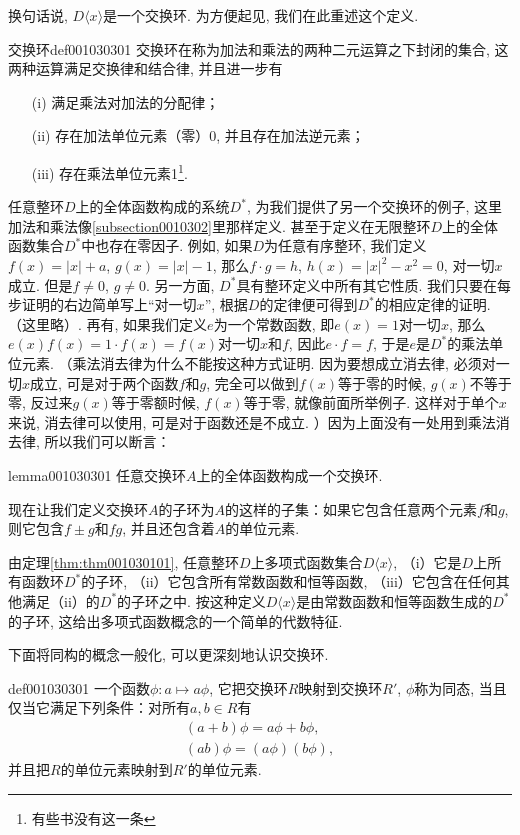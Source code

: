 换句话说, $D\langle{}x\rangle$是一个交换环. 为方便起见, 我们在此重述这个定义. 
\begin{definition}{交换环}{def001030301}
交换环在称为加法和乘法的两种二元运算之下封闭的集合, 这两种运算满足交换律和结合律, 并且进一步有
\begin{enumerate}
\item[(i)] 满足乘法对加法的分配律；
\item[(ii)] 存在加法单位元素（零）0, 并且存在加法逆元素；
\item[(iii)] 存在乘法单位元素1\footnote{有些书没有这一条}. 
\end{enumerate}
\end{definition}

任意整环$D$上的全体函数构成的系统$D^*$, 为我们提供了另一个交换环的例子, 这里加法和乘法像\ref{subsection0010302}里那样定义. 甚至于定义在无限整环$D$上的全体函数集合$D^*$中也存在零因子. 例如, 如果$D$为任意有序整环, 我们定义$f(x)=|x|+a$, $g(x)=|x|-1$, 那么$f\cdot{}g=h$, $h(x)=|x|^2-x^2=0$, 对一切$x$成立. 但是$f \neq 0$, $g \neq 0$. 另一方面, $D^*$具有整环定义中所有其它性质. 我们只要在每步证明的右边简单写上“对一切$x$”, 根据$D$的定律便可得到$D^*$的相应定律的证明. （这里略）. 再有, 如果我们定义$e$为一个常数函数, 即$e(x)=1$对一切$x$, 那么$e(x)f(x)=1\cdot{}f(x)=f(x)$对一切$x$和$f$, 因此$e \cdot f = f$, 于是$e$是$D^*$的乘法单位元素. （乘法消去律为什么不能按这种方式证明. 因为要想成立消去律, 必须对一切$x$成立, 可是对于两个函数$f$和$g$, 完全可以做到$f(x)$等于零的时候, $g(x)$不等于零, 反过来$g(x)$等于零额时候, $f(x)$等于零, 就像前面所举例子. 这样对于单个$x$来说, 消去律可以使用, 可是对于函数还是不成立. ）因为上面没有一处用到乘法消去律, 所以我们可以断言：
\begin{lemma}{}{lemma001030301}
任意交换环$A$上的全体函数构成一个交换环. 
\end{lemma}

现在让我们定义交换环$A$的子环为$A$的这样的子集：如果它包含任意两个元素$f$和$g$, 则它包含$f \pm g$和$fg$, 并且还包含着$A$的单位元素. 

由定理\ref{thm:thm001030101}, 任意整环$D$上多项式函数集合$D\langle{}x\rangle$, （i）它是$D$上所有函数环$D^*$的子环, （ii）它包含所有常数函数和恒等函数, （iii）它包含在任何其他满足（ii）的$D^*$的子环之中. 按这种定义$D\langle{}x\rangle$是由常数函数和恒等函数生成的$D^*$的子环, 这给出多项式函数概念的一个简单的代数特征. 

下面将同构的概念一般化, 可以更深刻地认识交换环. 
\begin{definition}{}{def001030301}
一个函数$\phi: a \mapsto a\phi$, 它把交换环$R$映射到交换环$R'$, $\phi$称为同态, 当且仅当它满足下列条件：对所有$a, b \in R$有
\begin{gather}
(a+b)\phi = a\phi + b\phi, \label{equ001030301}\\
(ab)\phi = (a\phi)(b\phi),\label{equ001030302}
\end{gather}
并且把$R$的单位元素映射到$R'$的单位元素. 
\end{definition}

